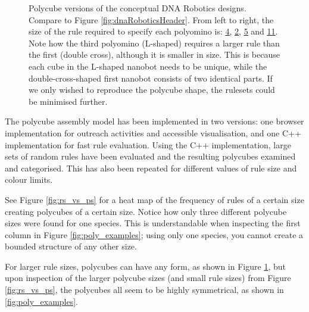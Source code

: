 \begin{figure}
\caption{Polycube versions of the conceptual DNA Robotics designs. Compare to Figure \ref{fig:dnaRoboticsHeader}. From left to right, the size of the rule required to specify each polyomino is: \href{https://akodiat.github.io/polycubes/view?hexRule=040890040707840c00000000888a00000000101400000000}{\underline{4}}, \href{https://akodiat.github.io/polycubes/view?hexRule=0a040b0b080a840e00000000}{\underline{2}}, \href{https://akodiat.github.io/polycubes/view?hexRule=06000c0b00001284000b080a0090140b00000000188c0000000014980000}{\underline{5}} and \href{https://akodiat.github.io/polycubes/view?hexRule=0406008800008400240000008c0800000000903400000000980c2f2f10129c1a0000000094000000002214141c000000000028a40000ac3200000000b43000000000}{\underline{11}}. Note how the third polyomino (L-shaped) requires a larger rule than the first (double cross), although it is smaller in size. This is because each cube in the L-shaped nanobot needs to be unique, while the double-cross-shaped first nanobot consists of two identical parts. If we only wished to reproduce the polycube shape, the rulesets could be minimised further.}
\label{fig:dnaRoboticPolycubes}\end{figure}

The polycube assembly model has been implemented in two versions: one browser implementation for outreach activities and accessible visualisation, and one C++ implementation for fast rule evaluation. Using the C++ implementation, large sets of random rules have been evaluated and the resulting polycubes examined and categorised. This has also been repeated for different values of rule size and colour limits.

See Figure \ref{fig:rs_vs_ps} for a heat map of the frequency of rules of a certain size creating polycubes of a certain size. Notice how only three different polycube sizes were found for one species. This is understandable when inspecting the first column in Figure \ref{fig:poly_examples}; using only one species, you cannot create a bounded structure of any other size.

For larger rule sizes, polycubes can have any form, as shown in Figure \ref{fig:dnaRoboticPolycubes}, but upon inspection of the larger polycube sizes (and small rule sizes) from Figure \ref{fig:rs_vs_ps}, the polycubes all seem to be highly symmetrical, as shown in \ref{fig:poly_examples}.


